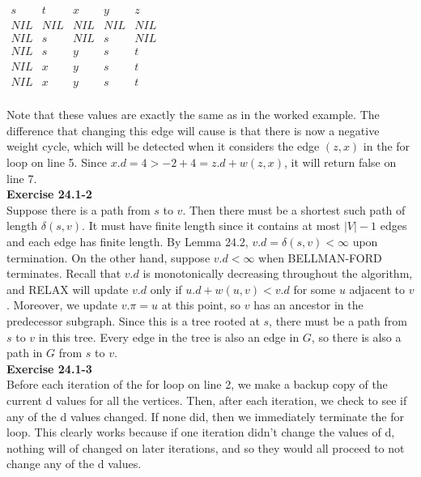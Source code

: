 \documentclass{article}
\begin{document}
\begin{center}
$
\begin{array}{|c|c|c|c|c|}
s&t&x&y&z\\
\hline
NIL&NIL&NIL&NIL&NIL\\
NIL&s&NIL&s&NIL\\
NIL&s&y&s&t\\
NIL&x&y&s&t\\
NIL&x&y&s&t\\
\end{array}
$
\end{center}

Note that these values are exactly the same as in the worked example. The difference that changing this edge will cause is that there is now a negative weight cycle, which will be detected when it considers the edge $(z,x)$ in the for loop on line 5. Since $x.d = 4 > -2 + 4 = z.d + w(z,x)$, it will return false on line 7.\\

\noindent\textbf{Exercise 24.1-2}\\

Suppose there is a path from $s$ to $v$.  Then there must be a shortest such path of length $\delta(s,v)$.  It must have finite length since it contains at most $|V| - 1$ edges and each edge has finite length.  By Lemma 24.2, $v.d = \delta(s,v) < \infty$ upon termination.  On the other hand, suppose $v.d < \infty$ when BELLMAN-FORD terminates.  Recall that $v.d$ is monotonically decreasing throughout the algorithm, and RELAX will update $v.d$ only if $u.d + w(u,v) < v.d$ for some $u$ adjacent to $v$.  Moreover, we update $v.\pi = u$ at this point, so $v$ has an ancestor in the predecessor subgraph.  Since this is a tree rooted at $s$, there must be a path from $s$ to $v$ in this tree.  Every edge in the tree is also an edge in $G$, so there is also a path in $G$ from $s$ to $v$. \\

\noindent\textbf{Exercise 24.1-3}\\

Before each iteration of the for loop on line 2, we make a backup copy of the current d values for all the vertices. Then, after each iteration, we check to see if any of the d values changed. If none did, then we immediately terminate the for loop. This clearly works because if one iteration didn't change the values of d, nothing will of changed on later iterations, and so they would all proceed to not change any of the d values.\\
\end{document}
